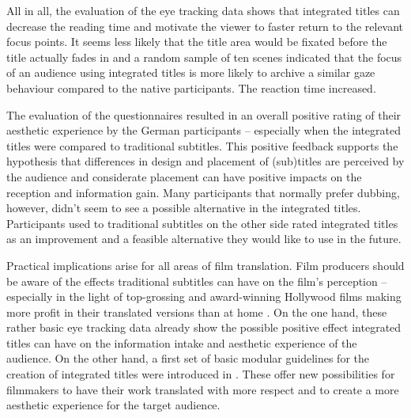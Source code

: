 \documentclass[output=paper]{langsci/langscibook}
\begin{document}
All in all, the evaluation of the eye tracking data shows that integrated titles can decrease the reading time and motivate the viewer to faster return to the relevant focus points. It seems less likely that the title area would be fixated before the title actually fades in and a random sample of ten scenes indicated that the focus of an audience using integrated titles is more likely to archive a similar gaze behaviour compared to the native participants. The reaction time increased.



The evaluation of the questionnaires resulted in an overall positive rating of their aesthetic experience by the German participants -- especially when the integrated titles were compared to traditional subtitles. This positive feedback supports the hypothesis that differences in design and placement of (sub)titles are perceived by the audience and considerate placement can have positive impacts on the reception and information gain. Many participants that normally prefer dubbing, however, didn't seem to see a possible alternative in the integrated titles. Participants used to traditional subtitles on the other side rated integrated titles as an improvement and a feasible alternative they would like to use in the future.



Practical implications arise for all areas of film translation. Film producers should be aware of the effects traditional subtitles can have on the film's perception -- especially in the light of top-grossing and award-winning Hollywood films making more profit in their translated versions than at home \citep[202]{romero2013}. On the one hand, these rather basic eye tracking data already show the possible positive effect integrated titles can have on the information intake and aesthetic experience of the audience. On the other hand, a first set of basic modular guidelines for the creation of integrated titles were introduced in \citet{fox2015}. These offer new possibilities for filmmakers to have their work translated with more respect and to create a more aesthetic experience for the target audience.
\end{document}
